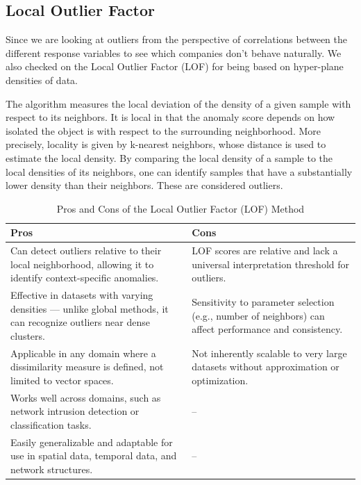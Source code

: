 \documentclass[11pt,english,a4paper,hidelinks]{book}
\begin{document}
\subsection{Local Outlier Factor}

Since we are looking at outliers from the perspective of correlations between the different response variables to see which companies don't behave naturally. We also checked on the Local Outlier Factor (LOF) for being based on hyper-plane densities of data.

\vspace{0.5cm}
\noindent The algorithm measures the local deviation of the density of a given sample with respect to its neighbors. It is local in that the anomaly score depends on how isolated the object is with respect to the surrounding neighborhood. More precisely, locality is given by k-nearest neighbors, whose distance is used to estimate the local density. By comparing the local density of a sample to the local densities of its neighbors, one can identify samples that have a substantially lower density than their neighbors. These are considered outliers. \textcite{breunig2000lof}


\begin{table}[H]
    \centering
    \begin{tabular}{|p{7cm}|p{7cm}|}
    \hline
    \textbf{Pros} & \textbf{Cons} \\
    \hline
    Can detect outliers relative to their local neighborhood, allowing it to identify context-specific anomalies. & LOF scores are relative and lack a universal interpretation threshold for outliers. \\
    \hline
    Effective in datasets with varying densities — unlike global methods, it can recognize outliers near dense clusters. & Sensitivity to parameter selection (e.g., number of neighbors) can affect performance and consistency. \\
    \hline
    Applicable in any domain where a dissimilarity measure is defined, not limited to vector spaces. & Not inherently scalable to very large datasets without approximation or optimization. \\
    \hline
    Works well across domains, such as network intrusion detection or classification tasks. & -- \\

    \hline
    Easily generalizable and adaptable for use in spatial data, temporal data, and network structures. & -- \\
    \hline
    \end{tabular}
    \caption{Pros and Cons of the Local Outlier Factor (LOF) Method}
\end{table}
    
\end{document}
